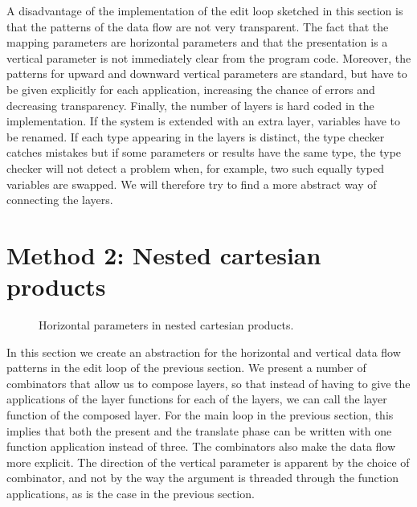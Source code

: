 A disadvantage of the implementation of the edit loop sketched in this section is that the patterns of the data flow are not very transparent. The fact that the mapping parameters are horizontal parameters and that the presentation is a vertical parameter is not immediately clear from the program code. Moreover, the patterns for upward and downward vertical parameters are standard, but have to be given explicitly for each application, increasing the chance of errors and decreasing transparency. Finally, the number of layers is hard coded in the implementation. If the system is extended with an extra layer, variables have to be renamed. If each type appearing in the layers is distinct, the type checker catches mistakes but if some parameters or results have the same type, the type checker will not detect a problem when, for example, two such equally typed variables are swapped. We will therefore try to find a more abstract way of connecting the layers.


%																
%																
%																
\section{Method 2: Nested cartesian products}

\label{sectncp}
\begin{figure}
\begin{small}
\begin{center}
\begin{center}
\begin{scriptsize}
\end{scriptsize}
\end{center}\caption{ Horizontal parameters in nested cartesian products.}\label{ncp} 
\end{center}
\end{small}
\end{figure}

 In this section we create an abstraction for the horizontal and vertical data flow patterns in the edit loop of the previous section. We present a number of combinators that allow us to compose layers, so that instead of having to give the applications of the layer functions for each of the layers, we can call the layer function of the composed layer. For the main loop in the previous section, this implies that both the present and the translate phase can be written with one function application instead of three. The combinators also make the data flow more explicit. The direction of the vertical parameter is apparent by the choice of combinator, and not by the way the argument is threaded through the function applications, as is the case in the previous section. 

